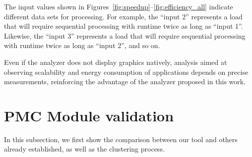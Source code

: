 The input values shown in Figures~\ref{fig:speedup}--\ref{fig:efficiency_all} indicate different data sets for processing. For example, the ``input 2'' represents a load that will require sequential processing with runtime twice as long as ``input 1''. Likewise, the ``input 3'' represents a load that will require sequential processing with runtime twice as long as ``input 2'', and so on.

Even if the analyzer does not display graphics natively, analysis aimed at observing scalability and energy consumption of applications depends on precise measurements, reinforcing the advantage of the analyzer proposed in this work.




\section{PMC Module validation} \label{sec:fingerprint_tool_validation}

In this subsection, we first show the comparison between our tool and others already established, as well as the clustering process.


